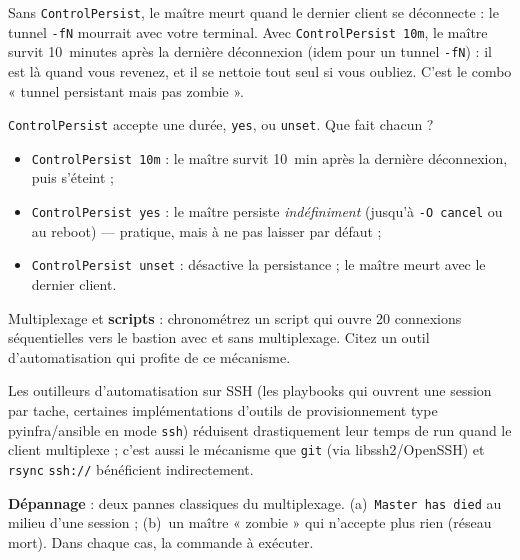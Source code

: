 \documentclass[a4paper,10pt]{exam}
\begin{document}
\begin{questions}
\begin{solution}
Sans \texttt{ControlPersist}, le maître meurt quand le dernier client se déconnecte : le
tunnel \texttt{-fN} mourrait avec votre terminal. Avec
\texttt{ControlPersist 10m}, le maître survit 10~minutes après la dernière déconnexion
(idem pour un tunnel \texttt{-fN}) : il est là quand vous revenez, et il se nettoie tout
seul si vous oubliez. C'est le combo « tunnel persistant mais pas zombie ».
\end{solution}
\question \texttt{ControlPersist} accepte une durée, \texttt{yes}, ou \texttt{unset}.
Que fait chacun ?
\begin{solution}
\begin{itemize}
  \item \texttt{ControlPersist 10m} : le maître survit 10~min après la dernière
        déconnexion, puis s'éteint ;
  \item \texttt{ControlPersist yes} : le maître persiste \emph{indéfiniment} (jusqu'à
        \texttt{-O cancel} ou au reboot) — pratique, mais à ne pas laisser par défaut ;
  \item \texttt{ControlPersist unset} : désactive la persistance ; le maître meurt avec
        le dernier client.
\end{itemize}
\end{solution}
\question Multiplexage et \textbf{scripts} : chronométrez un script qui ouvre 20 connexions
séquentielles vers le bastion avec et sans multiplexage. Citez un outil d'automatisation
qui profite de ce mécanisme.
\begin{solution}
Les outilleurs d'automatisation sur SSH (les playbooks qui ouvrent une session par tache,
certaines implémentations d'outils de provisionnement type pyinfra/ansible en mode
\texttt{ssh}) réduisent drastiquement leur temps de run quand le client multiplexe ;
c'est aussi le mécanisme que \texttt{git} (via libssh2/OpenSSH) et \texttt{rsync}
\texttt{ssh://} bénéficient indirectement.
\end{solution}
\question \textbf{Dépannage} : deux pannes classiques du multiplexage.
(a)~\texttt{Master has died} au milieu d'une session ; (b)~un maître « zombie » qui
n'accepte plus rien (réseau mort). Dans chaque cas, la commande à exécuter.
\begin{solution}
\begin{bashcode}

\end{bashcode}
\end{solution}
\end{questions}
\end{document}
